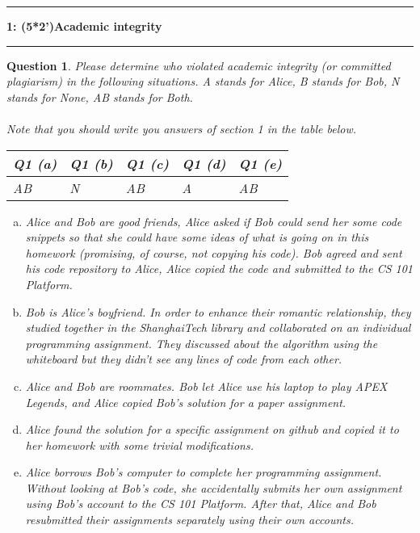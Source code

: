 \documentclass{article}
\newcommand\question[2]{\vspace{.25in}\hrule\textbf{#1: #2}\vspace{.5em}\hrule\vspace{.10in}}
\newtheorem{Q}{Question}
\begin{document}
\question{1}{(5*2')Academic integrity}
\begin{Q}
	Please determine who violated academic integrity (or committed plagiarism) in the following situations. A stands for Alice, B stands for Bob, N stands for None, AB stands for Both.
	\\ \\
	\textit{Note that you should write you answers of section 1 in the table below.}
	\begin{table}[htbp]
		\begin{tabular}{|p{1.5cm}|p{1.5cm}|p{1.5cm}|p{1.5cm}|p{1.5cm}|}
			\hline
			Q1 (a) & Q1 (b) & Q1 (c) & Q1 (d) & Q1 (e) \\
			\hline
			AB     & N      & AB     & A      & AB     \\
			\hline
		\end{tabular}
	\end{table}
	\begin{enumerate}[(a)]
		\item Alice and Bob are good friends, Alice asked if Bob could send her some code snippets so that she could have some ideas of what is going on in this homework (promising, of course, not copying his code). Bob agreed and sent his code repository to Alice, Alice copied the code and submitted to the CS 101 Platform.

		\item Bob is Alice's boyfriend. In order to enhance their romantic relationship, they studied together in the ShanghaiTech library and collaborated on an individual programming assignment. They discussed about the algorithm using the whiteboard but they didn't see any lines of code from each other.


		\item Alice and Bob are roommates. Bob let Alice use his laptop to play APEX Legends, and Alice copied Bob's solution for a paper assignment.

		\item Alice found the solution for a specific assignment on github and copied it to her homework with some trivial modifications.

		\item Alice borrows Bob's computer to complete her programming assignment. Without looking at Bob's code, she accidentally submits her own assignment using Bob's account to the CS 101 Platform. After that, Alice and Bob resubmitted their assignments separately using their own accounts.

	\end{enumerate}
\end{Q}
\end{document}
